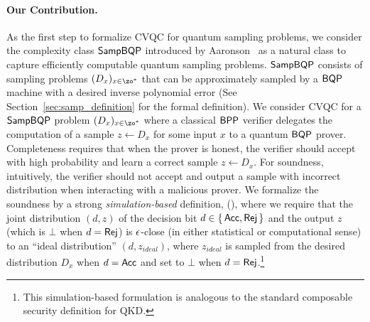 

\vspace{-3pt}

\paragraph{Our Contribution.}
As the first step to formalize CVQC for quantum sampling problems, we consider the complexity class $\operatorname{\mathsf{SampBQP}}$ introduced by Aaronson~\cite{aaronson_2013} as a natural class to capture efficiently computable quantum sampling problems. 
%
$\operatorname{\mathsf{SampBQP}}$ consists of sampling problems $(D_x)_{x\in\zo^*}$ that can be approximately sampled by a $\operatorname{\mathsf{BQP}}$ machine with a desired inverse polynomial error (See Section~\ref{sec:samp_definition} for the formal definition). We consider CVQC for a $\operatorname{\mathsf{SampBQP}}$ problem $(D_x)_{x\in\zo^*}$ where a classical $\operatorname{\mathsf{BPP}}$ verifier delegates the computation of a sample $z\leftarrow D_x$ for some input $x$ to a quantum $\operatorname{\mathsf{BQP}}$ prover. Completeness requires that when the prover is honest, the verifier should accept with high probability and learn a correct sample $z\leftarrow D_x$. For soundness, intuitively, the verifier should not accept and output a sample with incorrect distribution  when interacting with a malicious prover. We formalize the soundness by a strong \emph{simulation-based} definition, (),
where we require that the joint distribution $(d,z)$ of the decision bit $d \in \set{\mathsf{Acc}, \mathsf{Rej}}$ and the output $z$ (which is $\bot$ when $d = \mathsf{Rej}$) is $\epsilon$-close (in  either statistical or computational sense) to an ``ideal distribution'' $(d,z_{ideal})$, where $z_{ideal}$ is sampled from the desired distribution $D_x$ when $d = \mathsf{Acc}$ and set to $\bot$ when $d = \mathsf{Rej}$.\footnote{This simulation-based formulation is analogous to the standard composable security definition for QKD.}
%

